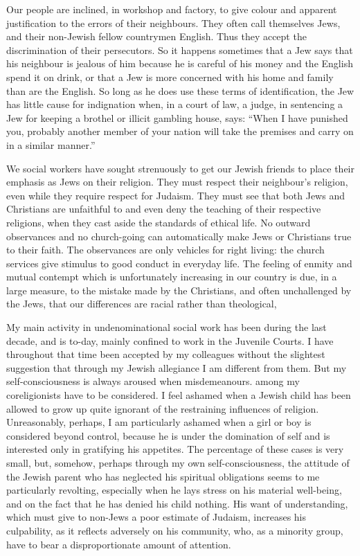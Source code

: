 Our people are inclined, in workshop and factory,
to give colour and apparent justification to the errors
of their neighbours. They often call themselves Jews,
and their non-Jewish fellow countrymen English. Thus
they accept the discrimination of their persecutors. So
it happens sometimes that a Jew says that his neighbour
is jealous of him because he is careful of his money and
the English spend it on drink, or that a Jew is more
concerned with his home and family than are the English.
So long as he does use these terms of identification, the
Jew has little cause for indignation when, in a court of
law, a judge, in sentencing a Jew for keeping a brothel
or illicit gambling house, says: “When I have punished
you, probably another member of your nation will take
the premises and carry on in a similar manner.”

We social workers have sought strenuously to get
our Jewish friends to place their emphasis as Jews on
their religion. They must respect their neighbour’s
religion, even while they require respect for Judaism.
They must see that both Jews and Christians are
unfaithful to and even deny the teaching of their respective
religions, when they cast aside the standards of ethical
life. No outward observances and no church-going can
automatically make Jews or Christians true to their
faith. The observances are only vehicles for right living:
the church services give stimulus to good conduct in
everyday life. The feeling of enmity and mutual contempt
which is unfortunately increasing in our country
is due, in a large measure, to the mistake made by the
Christians, and often unchallenged by the Jews, that our
differences are racial rather than theological,

My main activity in undenominational social work
has been during the last decade, and is to-day, mainly
confined to work in the Juvenile Courts. I have throughout
that time been accepted by my colleagues without
the slightest suggestion that through my Jewish allegiance
I am different from them. But my self-consciousness is
always aroused when misdemeanours. among my coreligionists
have to be considered. I feel ashamed when
a Jewish child has been allowed to grow up quite ignorant
of the restraining influences of religion. Unreasonably,
perhaps, I am particularly ashamed when a girl or boy
is considered beyond control, because he is under the
domination of self and is interested only in gratifying
his appetites. The percentage of these cases is very
small, but, somehow, perhaps through my own
self-consciousness, the attitude of the Jewish parent who
has neglected his spiritual obligations seems to me
particularly revolting, especially when he lays stress
on his material well-being, and on the fact that he has
denied his child nothing. His want of understanding,
which must give to non-Jews a poor estimate of Judaism,
increases his culpability, as it reflects adversely on his
community, who, as a minority group, have to bear a
disproportionate amount of attention.

